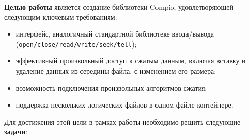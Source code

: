  \label{task_definition}

\textbf{Целью работы} является создание библиотеки Compio, удовлетворяющей следующим ключевым требованиям:
\begin{itemize}
    \item интерфейс, аналогичный стандартной библиотеке ввода/вывода (\texttt{open/close/read/write/seek/tell});
    \item эффективный произвольный доступ к сжатым данным, включая вставку и удаление данных из середины файла, с изменением его размера;
    \item возможность подключения произвольных алгоритмов сжатия;
    \item поддержка нескольких логических файлов в одном файле-контейнере.
\end{itemize}

Для достижения этой цели в рамках работы необходимо решить следующие \textbf{задачи}:

